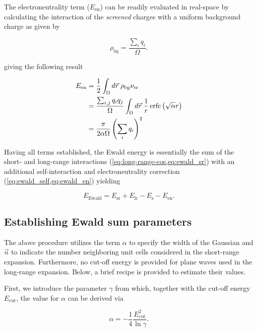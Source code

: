 The electroneutrality term ($E_{\text{en}}$) can be readily evaluated in real-space by calculating the interaction of the \textit{screened} charges with a uniform background charge as given by

\begin{equation}
    \rho_{\text{bg}} = \frac{\sum_{i}q_{i}}{\Omega}.
\end{equation}

giving the following result

\begin{align}
    E_{\text{en}} &= \frac{1}{2} \int_{\Omega} d\vec{r} \; \rho_{\text{bg}} \nu_{\text{sr}} \\
    &= \frac{\sum_{i,j}q_{i}q_{j}}{\Omega} \int_{\Omega} d\vec{r} \; \frac{1}{r} \operatorname{erfc} \left( \sqrt{\alpha} r \right) \\
    &= \frac{\pi}{2 \alpha \Omega} \left(\sum_{i} q_{i} \right)^{2}
    \label{eq:ewald_en}
\end{align}

Having all terms established, the Ewald energy is essentially the sum of the short- and long-range interactions (\cref{eq:long-range-cos,eq:ewald_sr}) with an additional self-interaction and electroneutrality correction (\cref{eq:ewald_self,eq:ewald_en}) yielding

\begin{equation}
    E_{\text{Ewald}} = E_{\text{sr}} + E_{\text{lr}} - E_{\text{s}} - E_{\text{en}}.
\end{equation}

%
%
%
\subsection{Establishing Ewald sum parameters}
\label{sec:est_ewald}

The above procedure utilizes the term $\alpha$ to specify the width of the Gaussian and $\vec{n}$ to indicate the number neighboring unit cells considered in the short-range expansion. Furthermore, no cut-off energy is provided for plane waves used in the long-range expansion. Below, a brief recipe is provided to estimate their values.

First, we introduce the parameter $\gamma$ from which, together with the cut-off energy $E_{\text{cut}}$, the value for $\alpha$ can be derived via

\begin{equation}
    \alpha = -\frac{1}{4} \frac{E_{\text{cut}}^{2}}{\ln \gamma}.
    \label{eq:alpha_ewald}
\end{equation}

